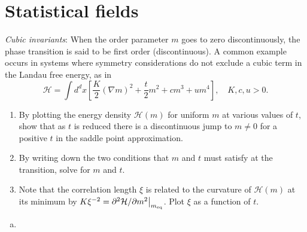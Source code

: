 \chapter{Statistical fields}

\begin{problem}
    \textit{Cubic invariants}: When the order parameter $m$ goes to zero discontinuously, the phase transition is said to be first order (discontinuous). A common example occurs in systems where symmetry considerations do not exclude a cubic term in the Landau free energy, as in
    \[
        \mathcal{H} = \int d^dx \left[\frac{K}{2}(\nabla m)^2 + \frac{t}{2}m^2 + cm^3 + um^4\right],
        \quad K,c,u > 0.
    \]

    \begin{enumerate}
        \item[(a)] By plotting the energy density $\mathcal{H}(m)$ for uniform $m$ at various values of $t$, show that as $t$ is reduced there is a discontinuous jump to $m \neq 0$ for a positive $t$ in the saddle point approximation.

        \item[(b)] By writing down the two conditions that $m$ and $t$ must satisfy at the transition, solve for $m$ and $t$.

        \item[(c)] Note that the correlation length $\xi$ is related to the curvature of $\mathcal{H}(m)$ at its minimum by $K\xi^{-2} = \partial^2\mathcal{H}/\partial m^2\big|_{m_{\rm eq}}$. Plot $\xi$ as a function of $t$.
    \end{enumerate}
\end{problem}

\begin{solution}
    \begin{enumerate}[(a)]
        \item
    \end{enumerate}
\end{solution}

